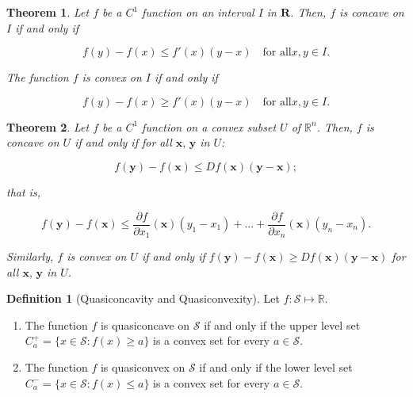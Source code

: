\documentclass{article}
\newtheorem{theorem}{Theorem}
\theoremstyle{definition}
\newtheorem{definition}{Definition}
\theoremstyle{Solution}
\begin{document}
\begin{theorem} 
Let $f$ be a $C^1$ function on an interval $I$ in $\textbf{R}$. Then, $f$ is concave on $I$ if and only if

\begin{equation}
	f(y)-f(x) \leq f'(x)(y-x) \quad \text{for all} x,y \in I.
\end{equation}

The function $f$ is convex on $I$ if and only if

\begin{equation}
		f(y)-f(x) \geq f'(x)(y-x) \quad \text{for all} x,y \in I.
\end{equation}
\end{theorem}

\begin{theorem}
Let $f$ be a $C^1$ function on a convex subset $U$ of $\mathbb{R}^n$. Then, $f$ is concave on $U$ if and only if for all $\textbf{x, y}$ in $U$:

\begin{equation}
	f(\textbf{y})-f(\textbf{x}) \leq Df(\textbf{x})(\textbf{y}-\textbf{x});
\end{equation}

that is,

\begin{equation}
	f(\textbf{y})-f(\textbf{x}) \leq \frac{\partial f}{\partial x_1}(\textbf{x})(y_1-x_1) +...+\frac{\partial f}{\partial x_n}(\textbf{x})(y_n-x_n).
\end{equation}

Similarly, $f$ is convex on $U$ if and only if $f(\textbf{y})-f(\textbf{x}) \geq Df(\textbf{x})(\textbf{y}-\textbf{x})$ for all $\textbf{x, y}$ in $U$.
\end{theorem}

\begin{definition}[Quasiconcavity and Quasiconvexity]
Let \(f:\mathcal{S}\mapsto\mathbb{R}\).\par
\begin{enumerate}
	\item The function \(f\) is quasiconcave on \(\mathcal{S}\) if and only if the upper level set \(C_a^+=\{x\in\mathcal{S}:f(x)\geq a\}\) is a convex set for every \(a\in\mathcal{S}\).
	\item The function \(f\) is quasiconvex on \(\mathcal{S}\) if and only if the lower level set \(C_a^-=\{x\in\mathcal{S}:f(x)\leq a\}\) is a convex set for every \(a\in\mathcal{S}\).
\end{enumerate}
\end{definition}
\end{document}
